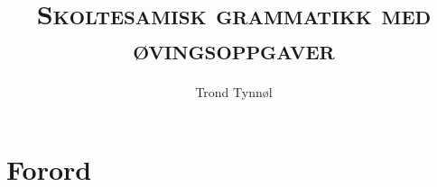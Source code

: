 \documentclass[b5paper, 11pt, twoside, showtrims]{memoir}
\begin{document}
	\pagestyle{simple}
	\frontmatter
	\title{\textsc{Skoltesamisk grammatikk med øvingsoppgaver}}
	\newcommand{\subtitle}{Prøveversjon juni 2026}
	\renewcommand{\maketitlehookb}{\centering\textsc{\subtitle}}
	\author{Trond Tynnøl}
	\date{}
	\maketitle
	
	\newpage
	
		
	\section{Forord}
	
	
	
	\renewcommand{\contentsname}{Innhold}
	\tableofcontents*
	
	\mainmatter
	
	
	
	
	
	
	
	
	
	
	
\end{document}
